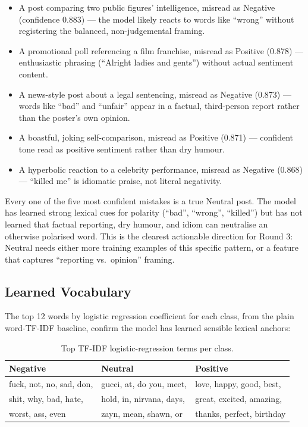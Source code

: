\documentclass[11pt,a4paper]{article}
\begin{document}
\begin{itemize}[leftmargin=*, itemsep=2pt]
    \small
    \item A post comparing two public figures' intelligence, misread as Negative (confidence 0.883) --- the model likely reacts to words like ``wrong'' without registering the balanced, non-judgemental framing.
    \item A promotional poll referencing a film franchise, misread as Positive (0.878) --- enthusiastic phrasing (``Alright ladies and gents'') without actual sentiment content.
    \item A news-style post about a legal sentencing, misread as Negative (0.873) --- words like ``bad'' and ``unfair'' appear in a factual, third-person report rather than the poster's own opinion.
    \item A boastful, joking self-comparison, misread as Positive (0.871) --- confident tone read as positive sentiment rather than dry humour.
    \item A hyperbolic reaction to a celebrity performance, misread as Negative (0.868) --- ``killed me'' is idiomatic praise, not literal negativity.
\end{itemize}

\begin{insightbox}
Every one of the five most confident mistakes is a true Neutral post. The model has learned strong lexical cues for polarity (``bad'', ``wrong'', ``killed'') but has not learned that factual reporting, dry humour, and idiom can neutralise an otherwise polarised word. This is the clearest actionable direction for Round 3: Neutral needs either more training examples of this specific pattern, or a feature that captures ``reporting vs.\ opinion'' framing.
\end{insightbox}

\subsection{Learned Vocabulary}

The top 12 words by logistic regression coefficient for each class, from the plain word-TF-IDF baseline, confirm the model has learned sensible lexical anchors:

\begin{table}[H]
\centering
\small
\begin{tabular}{@{}lll@{}}
\toprule
\textbf{Negative} & \textbf{Neutral} & \textbf{Positive} \\
\midrule
fuck, not, no, sad, don, & gucci, at, do you, meet, & love, happy, good, best, \\
shit, why, bad, hate, & hold, in, nirvana, days, & great, excited, amazing, \\
worst, ass, even & zayn, mean, shawn, or & thanks, perfect, birthday \\
\bottomrule
\end{tabular}
\caption{Top TF-IDF logistic-regression terms per class.}
\end{table}
\end{document}
